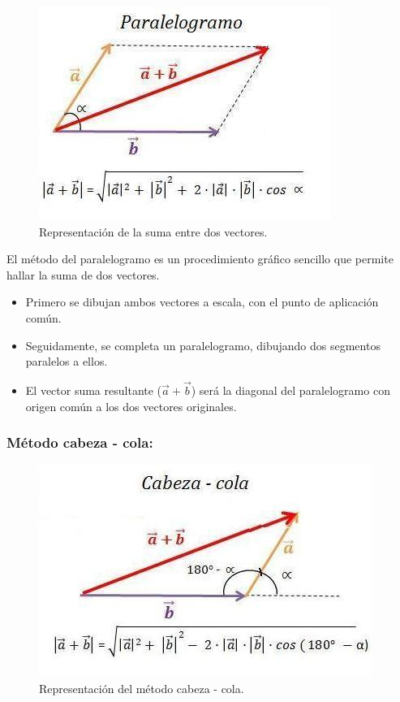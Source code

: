 \begin{figure}
\centering
 \includegraphics[scale=0.6]{images/suma-vectores-metodo-paralelogramo.jpg}
    \caption{\small{Representación de la suma entre dos vectores.}}
\end{figure}

El método del paralelogramo es un procedimiento gráfico sencillo que permite hallar la suma de dos vectores.

\begin{itemize}
 \item Primero se dibujan ambos vectores a escala, con el punto de aplicación común.
 \item Seguidamente, se completa un paralelogramo, dibujando dos segmentos paralelos a ellos.
 \item El vector suma resultante ($\vec{a} + \vec{b}$) será la diagonal del paralelogramo con origen común a los dos 
 vectores originales.
\end{itemize}

\subsubsection{Método cabeza - cola:}

\begin{figure}[H]
 \includegraphics[scale=0.7]{images/suma-vectores-metodo-cabeza-cola.jpg}
    \caption{\small{Representación del método cabeza - cola.}}
\end{figure}

